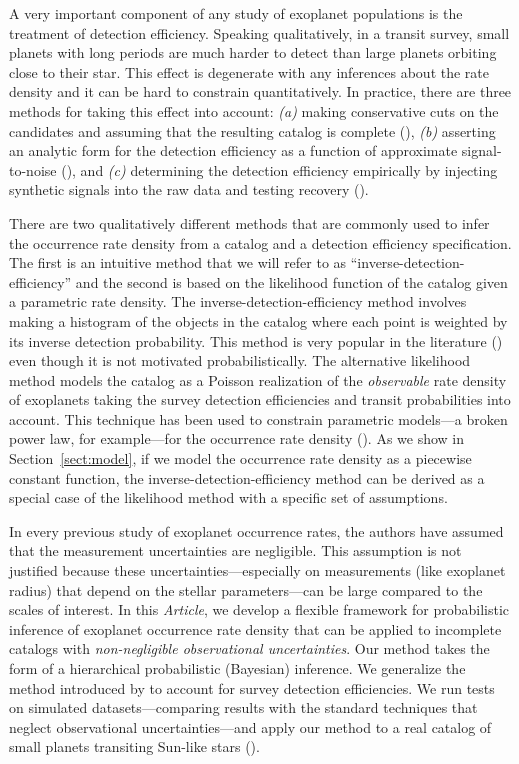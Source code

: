 \documentclass[12pt,preprint]{aastex}
\newcommand{\paper}{\textsl{Article}}
\newcommand{\Sect}[1]{Section~\ref{sect:#1}}
\newcommand{\sect}[1]{\Sect{#1}}
\begin{document}
A very important component of any study of exoplanet populations is the
treatment of detection efficiency.
Speaking qualitatively, in a transit survey, small planets with long periods
are much harder to detect than large planets orbiting close to their star.
This effect is degenerate with any inferences about the rate density and it
can be hard to constrain quantitatively.
In practice, there are three methods for taking this effect into account:
\emph{(a)} making conservative cuts on the candidates and assuming that the
resulting catalog is complete (\citealt{catanzarite, traub, tremaine}),
\emph{(b)} asserting an analytic form for the detection efficiency as a
function of approximate signal-to-noise (\citealt{youdin, howard, dressing,
dong, fressin-fp, morton-swift}), and \emph{(c)} determining the detection
efficiency empirically by injecting synthetic signals into the raw data and
testing recovery (\citealt{petigura-a, petigura}).

There are two qualitatively different methods that are commonly used to infer
the occurrence rate density from a catalog and a detection efficiency
specification.
The first is an intuitive method that we will refer to as
``inverse-detection-efficiency'' and the second is based on the likelihood
function of the catalog given a parametric rate density.
The inverse-detection-efficiency method involves making a histogram of the
objects in the catalog where each point is weighted by its inverse detection
probability.
This method is very popular in the literature (\citealt{howard, dong,
dressing, swift, petigura}) even though it is not motivated probabilistically.
The alternative likelihood method models the catalog as a Poisson realization
of the \emph{observable} rate density of exoplanets taking the survey
detection efficiencies and transit probabilities into account.
This technique has been used to constrain parametric models---a broken power
law, for example---for the occurrence rate density (\citealt{tabachnik,
youdin, dong}).
As we show in \sect{model}, if we model the occurrence rate density as a
piecewise constant function, the inverse-detection-efficiency method can be
derived as a special case of the likelihood method with a specific set of
assumptions.

In every previous study of exoplanet occurrence rates, the authors have
assumed that the measurement uncertainties are negligible.
This assumption is not justified because these uncertainties---especially on
measurements (like exoplanet radius) that depend on the stellar
parameters---can be large compared to the scales of interest.
In this \paper, we develop a flexible framework for probabilistic inference of
exoplanet occurrence rate density that can be applied to incomplete catalogs
with \emph{non-negligible observational uncertainties}.
Our method takes the form of a hierarchical probabilistic (Bayesian)
inference.
We generalize the method introduced by \citet{hogge} to account for survey
detection efficiencies.
We run tests on simulated datasets---comparing results with the standard
techniques that neglect observational uncertainties---and apply our method to
a real catalog of small planets transiting Sun-like stars
(\citealt{petigura}).
\end{document}
